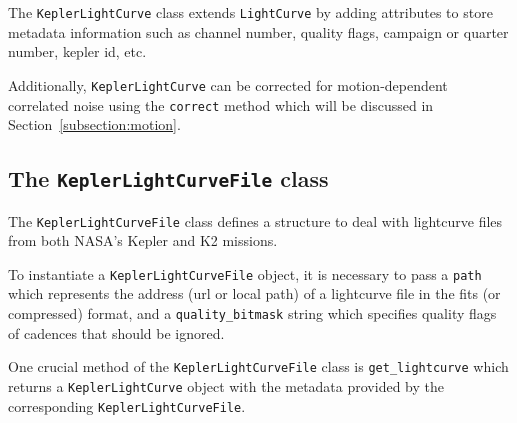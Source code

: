 \documentclass{article}
\begin{document}
       The \texttt{KeplerLightCurve} class extends \texttt{LightCurve} by
       adding attributes to store metadata information such as channel number,
       quality flags, campaign or quarter number, kepler id, etc.

       Additionally, \texttt{KeplerLightCurve} can be corrected for motion-dependent
       correlated noise using the \texttt{correct} method which will be discussed in
       Section~\ref{subsection:motion}.

   \subsection{The \texttt{KeplerLightCurveFile} class}
        The \texttt{KeplerLightCurveFile} class defines a structure to deal
        with lightcurve files from both NASA's Kepler and K2 missions.

        To instantiate a \texttt{KeplerLightCurveFile} object, it is necessary
        to pass a \texttt{path} which represents the address (url or local path)
        of a lightcurve file in the fits (or compressed) format, and a
        \texttt{quality\_bitmask} string which specifies quality
        flags of cadences that should be ignored.

        One crucial method of the \texttt{KeplerLightCurveFile} class is
        \texttt{get\_lightcurve} which returns a \texttt{KeplerLightCurve} object
        with the metadata provided by the corresponding \texttt{KeplerLightCurveFile}.
\end{document}

